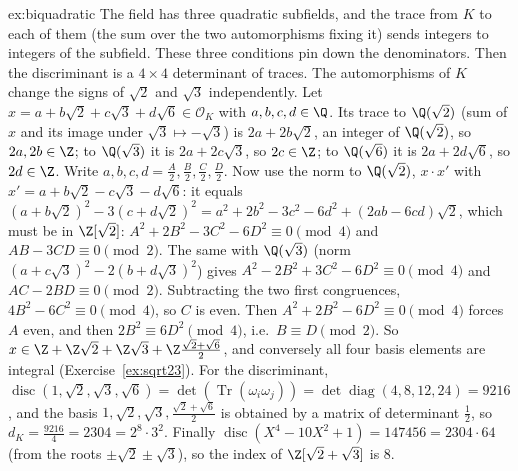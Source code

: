 \begin{solution}{ex:biquadratic}
\idea The field has three quadratic subfields, and the trace from $K$ to each of them (the sum over the two
automorphisms fixing it) sends integers to integers of the subfield. These three conditions pin down the
denominators. Then the discriminant is a $4\times4$ determinant of traces.
\writeup The automorphisms of $K$ change the signs of $\sqrt2$ and $\sqrt3$ independently. Let
$x=a+b\sqrt2+c\sqrt3+d\sqrt6\in\mathcal O_K$ with $a,b,c,d\in\Q$. Its trace to $\Q(\sqrt2)$ (sum of $x$ and its image
under $\sqrt3\mapsto-\sqrt3$) is $2a+2b\sqrt2$, an integer of $\Q(\sqrt2)$, so $2a,2b\in\Z$; to $\Q(\sqrt3)$ it is
$2a+2c\sqrt3$, so $2c\in\Z$; to $\Q(\sqrt6)$ it is $2a+2d\sqrt6$, so $2d\in\Z$. Write $a,b,c,d=\frac{A}2,\frac B2,\frac C2,
\frac D2$. Now use the norm to $\Q(\sqrt2)$, $x\cdot x'$ with $x'=a+b\sqrt2-c\sqrt3-d\sqrt6$: it equals
$(a+b\sqrt2)^2-3(c+d\sqrt2)^2=a^2+2b^2-3c^2-6d^2+(2ab-6cd)\sqrt2$, which must be in $\Z[\sqrt2]$:
$A^2+2B^2-3C^2-6D^2\equiv0\pmod4$ and $AB-3CD\equiv0\pmod2$. The same with $\Q(\sqrt3)$ (norm
$(a+c\sqrt3)^2-2(b+d\sqrt3)^2$) gives $A^2-2B^2+3C^2-6D^2\equiv0\pmod4$ and $AC-2BD\equiv0\pmod2$. Subtracting the
two first congruences, $4B^2-6C^2\equiv0\pmod4$, so $C$ is even. Then $A^2+2B^2-6D^2\equiv0\pmod4$ forces $A$ even, and
then $2B^2\equiv6D^2\pmod4$, i.e.\ $B\equiv D\pmod2$. So $x\in\Z+\Z\sqrt2+\Z\sqrt3+\Z\frac{\sqrt2+\sqrt6}2$, and
conversely all four basis elements are integral (Exercise~\ref{ex:sqrt23}). For the discriminant,
$\operatorname{disc}(1,\sqrt2,\sqrt3,\sqrt6)=\det(\operatorname{Tr}(\omega_i\omega_j))=\det\operatorname{diag}(4,8,12,24)=
9216$, and the basis $1,\sqrt2,\sqrt3,\frac{\sqrt2+\sqrt6}2$ is obtained by a matrix of determinant $\frac12$, so
$d_K=\frac{9216}4=2304=2^8\cdot3^2$. Finally $\operatorname{disc}(X^4-10X^2+1)=147456=2304\cdot64$ (from the roots
$\pm\sqrt2\pm\sqrt3$), so the index of $\Z[\sqrt2+\sqrt3]$ is $8$.
\end{solution}

